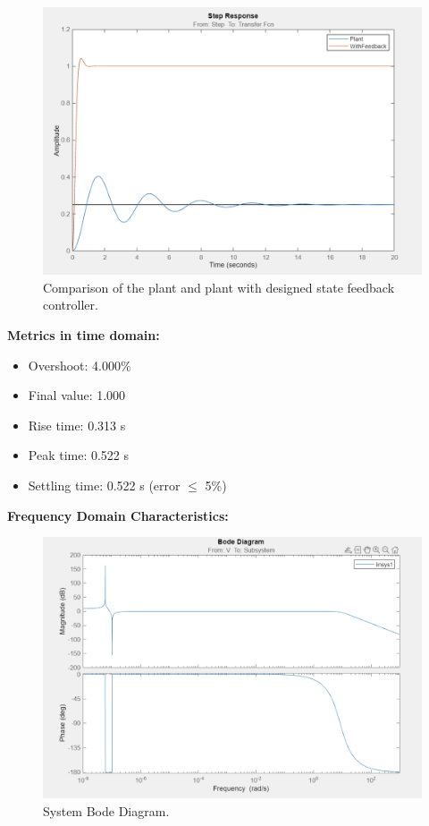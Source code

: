 \documentclass[12pt, oneside]{article}
\begin{document}
\begin{figure}[htbp]
    \centering
    \includegraphics[width=\linewidth]{Report/pics/Compare.png}
    \caption{Comparison of the plant and plant with designed state feedback controller.}
    \label{fig:my_label}
\end{figure}


\FloatBarrier

\textbf{Metrics in time domain:}
\begin{itemize}
            \item Overshoot: 4.000\%
            \item Final value: 1.000
            \item Rise time: 0.313 s
            \item Peak time: 0.522 s
            \item Settling time: 0.522 s (error $\leq$ 5\%)
\end{itemize}

\textbf{Frequency Domain Characteristics:}
\begin{figure}[htbp]
    \centering
    \includegraphics[width=\linewidth]{Report/pics/SystemBode.png}
    \caption{System Bode Diagram.}
    \label{fig:BodeDiagram}
\end{figure}
        
\end{document}
